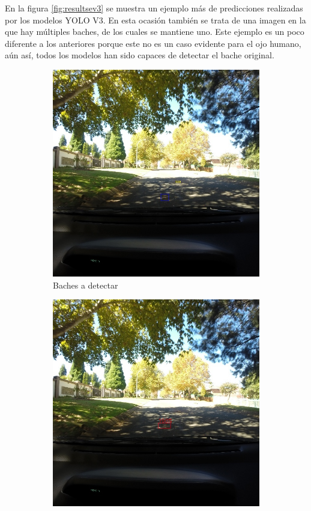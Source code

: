 En la figura \ref{fig:resultsev3} se muestra un ejemplo más de predicciones realizadas por los modelos YOLO V3. En esta ocasión también se trata de una imagen en la que hay múltiples baches, de los cuales se mantiene uno. Este ejemplo es un poco diferente a los anteriores porque este no es un caso evidente para el ojo humano, aún así, todos los modelos han sido capaces de detectar el bache original.

\begin{figure}[H]
	\centering
	\begin{subfigure}[h]{0.45\linewidth}
		\includegraphics[width=\linewidth]{images/results_e_gt.jpg}
		\caption{Baches a detectar}
	\end{subfigure}
	\begin{subfigure}[h]{0.45\linewidth}
		\includegraphics[width=\linewidth]{images/results_e_yolo_v3_256.jpg}

\end{subfigure}
\end{figure}
